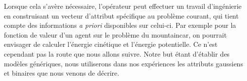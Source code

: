 \documentclass[frenchb,a4paper,justified,notoc]{tufte-book}
\begin{document}
Lorsque cela s'avère nécessaire, l'opérateur peut effectuer un travail d'ingénierie en construisant un vecteur d'attribut spécifique au problème courant, qui tient compte des informations \emph{a priori} disponibles sur celui-ci. Par exemple pour la fonction de valeur d'un agent sur le problème du \gls{mountaincar}, on pourrait envisager de calculer l'énergie cinétique et l'énergie potentielle. Ce n'est cependant pas la route que nous allons suivre. Notre but étant d'établir des modèles génériques, nous utiliserons dans nos expériences les attributs gaussiens et binaires que nous venons de décrire. 
\begin{figure}
\end{figure}
\end{document}
